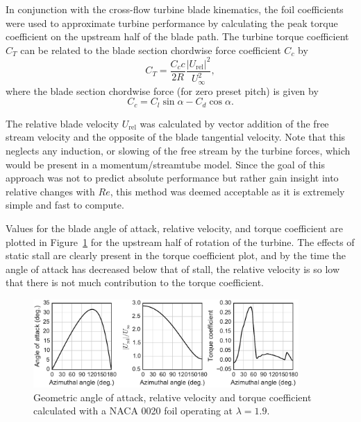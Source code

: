 \documentclass[energies,article,accept,moreauthors,pdftex,12pt,a4paper]{mdpi}
\begin{document}
In conjunction with the cross-flow turbine blade kinematics, the foil
coefficients were used to approximate turbine performance by calculating the
peak torque coefficient on the upstream half of the blade path. The turbine
torque coefficient $C_T$ can be related to the blade section chordwise force
coefficient $C_c$ by
\begin{equation}
C_T = \frac{C_c c}{2R} \frac{|U_\mathrm{rel}|^2}{U_\infty^2},
\label{eq:ct}
\end{equation}
where the blade section chordwise force (for zero preset pitch) is given by
\begin{equation}
C_c = C_l \sin \alpha - C_d \cos \alpha.
\label{eq:cc}
\end{equation}

The relative blade velocity $U_\mathrm{rel}$ was calculated by vector addition
of the free stream velocity and the opposite of the blade tangential velocity.
Note that this neglects any induction, or slowing of the free stream by the
turbine forces, which would be present in a momentum/streamtube model. Since the
goal of this approach was not to predict absolute performance but rather gain
insight into relative changes with $Re$, this method was deemed acceptable as it
is extremely simple and fast to compute.

Values for the blade angle of attack, relative velocity, and torque coefficient
are plotted in Figure~\ref{fig:blade-kinematics} for the upstream half of
rotation of the turbine. The effects of static stall are clearly present in the
torque coefficient plot, and by the time the angle of attack has decreased below
that of stall, the relative velocity is so low that there is not much
contribution to the torque coefficient.

\begin{figure}[ht!]
\centering

\includegraphics[width=0.9\textwidth]{figures/foil_kinematics_ct}

\caption{Geometric angle of attack, relative velocity and torque coefficient
    calculated with a NACA 0020 foil operating at $\lambda=1.9$.}

\label{fig:blade-kinematics}
\end{figure}
\end{document}
